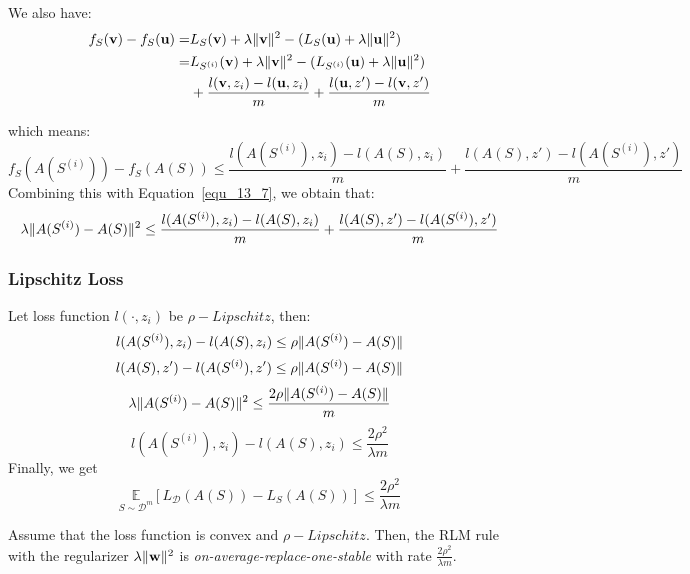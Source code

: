 We also have:
\begin{equation}
	\begin{aligned}
		f_S(\mathbf{v}) - f_S(\mathbf{u}) =&
		L_S(\mathbf{v}) + \lambda \Arrowvert \mathbf{v} \Arrowvert^2 
		- (L_S(\mathbf{u})+\lambda \Arrowvert \mathbf{u} \Arrowvert^2) \\
		=& L_{S^{(i)}}(\mathbf{v}) + \lambda \Arrowvert \mathbf{v} \Arrowvert^2 
		- (L_{S^{(i)}}(\mathbf{u}) + \lambda \Arrowvert \mathbf{u} \Arrowvert^2) \\
		 & + \frac{l(\mathbf{v}, z_i)-l(\mathbf{u}, z_i)}{m}
		 + \frac{l(\mathbf{u}, z') - l(\mathbf{v}, z')}{m}
	\end{aligned}
\end{equation}

which means:
\begin{equation}
	f_S(A(S^{(i)})) - f_S(A(S)) \le
	\frac{l(A(S^{(i)}),z_i) - l(A(S), z_i)}{m}
	+ \frac{l(A(S), z')-l(A(S^{(i)}),z')}{m}
\end{equation}
Combining this with Equation~\ref{equ_13_7}, we obtain that:
\begin{equation}
	\label{equ_13_10}
	\lambda \Arrowvert A(S^{(i)}) - A(S) \Arrowvert^2 \le
	\frac{l(A(S^{(i)}),z_i) - l(A(S), z_i)}{m}
	+ \frac{l(A(S), z')-l(A(S^{(i)}),z')}{m}
\end{equation}


\subsubsection{Lipschitz Loss}

Let loss function $ l(\cdot, z_i) $ be $ \rho-Lipschitz $, then:
\[
	l(A(S^{(i)}),z_i) - l(A(S), z_i) \le \rho \Arrowvert A(S^{(i)}) - A(S) \Arrowvert \\
\]
\[
	l(A(S), z')-l(A(S^{(i)}),z') \le \rho \Arrowvert A(S^{(i)}) - A(S) \Arrowvert
\]
\[
\lambda \Arrowvert A(S^{(i)}) - A(S) \Arrowvert^2 \le \frac{2\rho \Arrowvert A(S^{(i)}) - A(S) \Arrowvert}{m}
\]
\[
	l(A(S^{(i)}),z_i) - l(A(S), z_i) \le \frac{2\rho^2}{\lambda m}
\]
Finally, we get
\begin{equation}
	\underset{S \sim \mathcal{D}^m}{\mathbb{E}}
	[L_\mathcal{D}(A(S)) - L_S(A(S))] \le \frac{2\rho^2}{\lambda m}
\end{equation}

\begin{thm}
	Assume that the loss function is convex and $ \rho-Lipschitz $. Then, the RLM rule with the regularizer
	$ \lambda \Arrowvert \mathbf{w} \Arrowvert^2 $ is \emph{on-average-replace-one-stable} 
	with rate $ \frac{2\rho^2}{\lambda m} $.
\end{thm}

